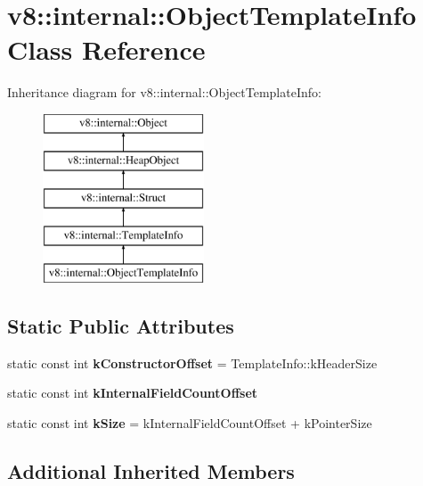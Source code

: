 \hypertarget{classv8_1_1internal_1_1_object_template_info}{}\section{v8\+:\+:internal\+:\+:Object\+Template\+Info Class Reference}
\label{classv8_1_1internal_1_1_object_template_info}
Inheritance diagram for v8\+:\+:internal\+:\+:Object\+Template\+Info\+:\begin{figure}[H]
\begin{center}
\leavevmode
\includegraphics[height=5.000000cm]{classv8_1_1internal_1_1_object_template_info}
\end{center}
\end{figure}
\subsection*{Static Public Attributes}
\begin{DoxyCompactItemize}
\item 
\hypertarget{classv8_1_1internal_1_1_object_template_info_ac85e930d4eb0afdbceb4a18a9a8c2f7a}{}static const int {\bfseries k\+Constructor\+Offset} = Template\+Info\+::k\+Header\+Size\label{classv8_1_1internal_1_1_object_template_info_ac85e930d4eb0afdbceb4a18a9a8c2f7a}

\item 
static const int {\bfseries k\+Internal\+Field\+Count\+Offset}
\item 
\hypertarget{classv8_1_1internal_1_1_object_template_info_ac2127e12b389db233019614294845f3d}{}static const int {\bfseries k\+Size} = k\+Internal\+Field\+Count\+Offset + k\+Pointer\+Size\label{classv8_1_1internal_1_1_object_template_info_ac2127e12b389db233019614294845f3d}

\end{DoxyCompactItemize}
\subsection*{Additional Inherited Members}


